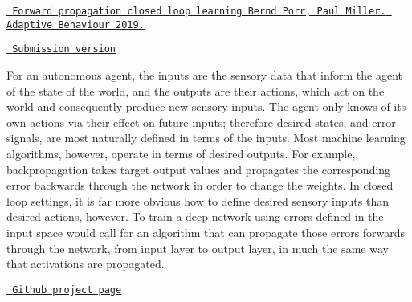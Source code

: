 \label{index_md_doxy}%
%
 \href{https://journals.sagepub.com/doi/10.1177/1059712319851070}{\texttt{ Forward propagation closed loop learning Bernd Porr, Paul Miller. Adaptive Behaviour 2019.}}

\href{https://www.berndporr.me.uk/Porr_Miller_FCL_2019_Adaptive_Behaviour.pdf}{\texttt{ Submission version}}

For an autonomous agent, the inputs are the sensory data that inform the agent of the state of the world, and the outputs are their actions, which act on the world and consequently produce new sensory inputs. The agent only knows of its own actions via their effect on future inputs; therefore desired states, and error signals, are most naturally defined in terms of the inputs. Most machine learning algorithms, however, operate in terms of desired outputs. For example, backpropagation takes target output values and propagates the corresponding error backwards through the network in order to change the weights. In closed loop settings, it is far more obvious how to define desired sensory inputs than desired actions, however. To train a deep network using errors defined in the input space would call for an algorithm that can propagate those errors forwards through the network, from input layer to output layer, in much the same way that activations are propagated.

\href{https://github.com/glasgowneuro/feedforward_closedloop_learning}{\texttt{ Github project page}} 